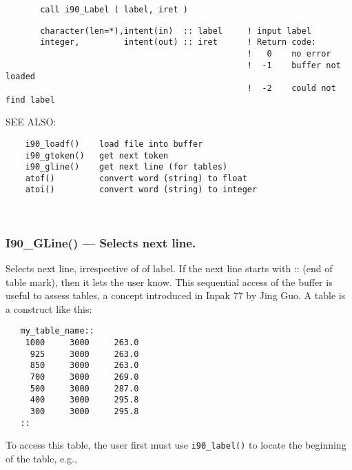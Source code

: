 \begin{verbatim}             
       call i90_Label ( label, iret )
\end{verbatim}
\begin{verbatim}
       character(len=*),intent(in)  :: label     ! input label
       integer,         intent(out) :: iret      ! Return code:
                                                 !   0    no error
                                                 !  -1    buffer not loaded
                                                 !  -2    could not find label
\end{verbatim}
{\sf SEE ALSO:}
\begin{verbatim}    i90_loadf()    load file into buffer
    i90_gtoken()   get next token
    i90_gline()    get next line (for tables)
    atof()         convert word (string) to float
    atoi()         convert word (string) to integer
    \end{verbatim}%
 
 
\mbox{}\hrulefill\ 
 
  \subsubsection{I90\_GLine() --- Selects next line. }
  
       Selects next line, irrespective of of label. If the next line starts
   with :: (end of table mark), then it lets the user know. This sequential
   access of the buffer is useful to assess tables, a concept introduced
   in Inpak 77 by Jing Guo. A table is a construct like this:
  
   \begin{verbatim}
   my_table_name::
    1000     3000     263.0   
     925     3000     263.0
     850     3000     263.0
     700     3000     269.0
     500     3000     287.0
     400     3000     295.8
     300     3000     295.8    
   ::
   \end{verbatim}
  
   To access this table, the user first must use {\tt i90\_label()} to 
   locate the beginning of the table, e.g.,
  
